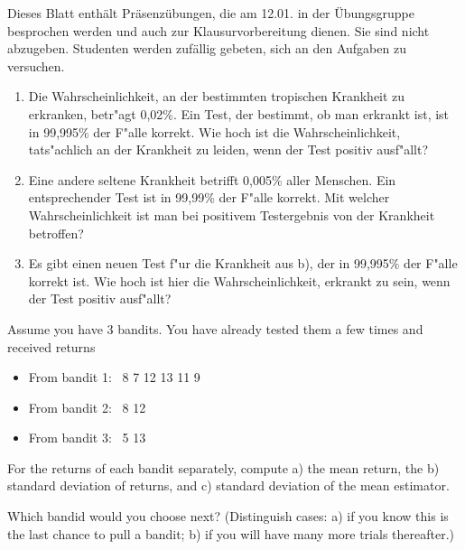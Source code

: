

\renewcommand{\course}{Artificial Intelligence}
\renewcommand{\coursepicture}{course_ai}
\renewcommand{\coursedate}{Winter 2019}
\renewcommand{\exnum}{7}

\exercises

Dieses Blatt enthält Präsenzübungen, die am 12.01. in der
Übungsgruppe besprochen werden und auch zur Klausurvorbereitung
dienen. Sie sind nicht abzugeben. Studenten werden zufällig gebeten,
sich an den Aufgaben zu versuchen.


\begin{enumerate}

\item Die Wahrscheinlichkeit, an der bestimmten tropischen Krankheit
  zu erkranken, betr"agt 0,02\%.  Ein Test, der bestimmt, ob man
  erkrankt ist, ist in 99,995\% der F"alle korrekt. Wie hoch ist die
  Wahrscheinlichkeit, tats"achlich an der Krankheit zu leiden, wenn
  der Test positiv ausf"allt?

\item Eine andere seltene Krankheit betrifft 0,005\% aller
  Menschen. Ein entsprechender Test ist in 99,99\% der F"alle
  korrekt. Mit welcher Wahrscheinlichkeit ist man bei positivem
  Testergebnis von der Krankheit betroffen?

\item Es gibt einen neuen Test f"ur die Krankheit aus b), der in
  99,995\% der F"alle korrekt ist. Wie hoch ist hier die
  Wahrscheinlichkeit, erkrankt zu sein, wenn der Test positiv
  ausf"allt?

\end{enumerate}


Assume you have 3 bandits. You have already tested them a few times
and received returns
\begin{itemize}
\item From bandit 1:~ 8 7 12 13 11 9
\item From bandit 2:~ 8 12
\item From bandit 3:~ 5 13
\end{itemize}

For the returns of each bandit separately, compute a) the mean return,
the b) standard deviation of returns, and c) standard deviation of the
mean estimator.

Which bandid would you choose next? (Distinguish cases: a) if you know
this is the last chance to pull a bandit; b) if you will have many
more trials thereafter.)


\exerfoot
